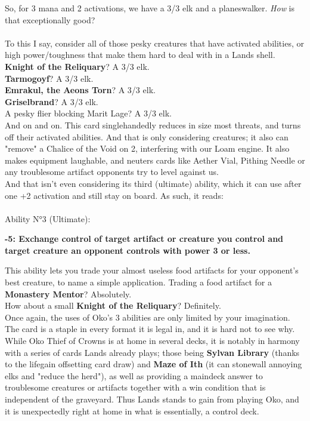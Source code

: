 \documentclass{report}
\begin{document}
So, for 3 mana and 2 activations, we have a 3/3 elk and a planeswalker. \emph{How} is that exceptionally good?\\\\
To this I say, consider all of those pesky creatures that have activated abilities, or high power/toughness that make them hard to deal with in a Lands shell.\\
\textbf{Knight of the Reliquary}? A 3/3 elk.\\
\textbf{Tarmogoyf}? A 3/3 elk.\\
\textbf{Emrakul, the Aeons Torn}? A 3/3 elk.\\
\textbf{Griselbrand}? A 3/3 elk.\\
A pesky flier blocking Marit Lage? A 3/3 elk.\\
And on and on. This card singlehandedly reduces in size most threats, and turns off their activated abilities. And that is only considering creatures; it also can "remove" a Chalice of the Void on 2, interfering with our Loam engine. It also makes equipment laughable, and neuters cards like Aether Vial, Pithing Needle or any troublesome artifact opponents try to level against us.\\
And that isn't even considering its third (ultimate) ability, which it can use after one +2 activation and still stay on board. As such, it reads:\\\\
Ability N°3 (Ultimate):\\
\begin{center}
\textbf{-5: Exchange control of target artifact or creature you control and target creature an opponent controls with power 3 or less.}
\end{center}
This ability lets you trade your almost useless food artifacts for your opponent's best creature, to name a simple application. Trading a food artifact for a \textbf{Monastery Mentor}? Absolutely.\\
How about a small \textbf{Knight of the Reliquary}? Definitely.\\
Once again, the uses of Oko's 3 abilities are only limited by your imagination. The card is a staple in every format it is legal in, and it is hard not to see why.\\
While Oko Thief of Crowns is at home in several decks, it is notably in harmony with a series of cards Lands already plays; those being \textbf{Sylvan Library} (thanks to the lifegain offsetting card draw) and \textbf{Maze of Ith} (it can stonewall annoying elks and "reduce the herd"), as well as providing a maindeck answer to troublesome creatures or artifacts together with a win condition that is independent of the graveyard. Thus Lands stands to gain from playing Oko, and it is unexpectedly right at home in what is essentially, a control deck.\\
\end{document}
